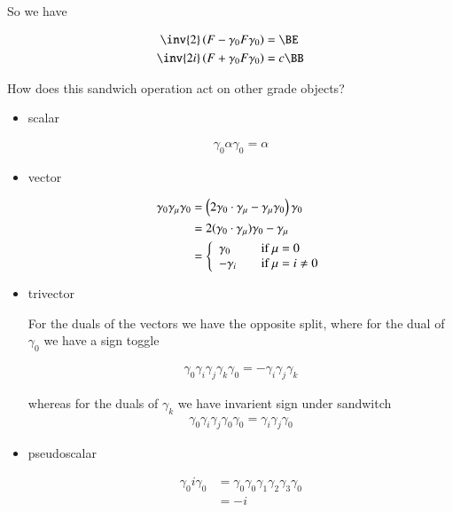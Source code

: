 \documentclass{article}
\begin{document}
So we have

\begin{align*}
\inv{2} \left(F - \gamma_0 F \gamma_0 \right) &= \BE \\
\inv{2i} \left(F + \gamma_0 F \gamma_0 \right) &= c \BB
\end{align*}

How does this sandwich operation act on other grade objects?

\begin{itemize}
\item scalar

\begin{align*}
\gamma_0 \alpha \gamma_0 = \alpha
\end{align*}

\item vector

\begin{align*}
\gamma_0 \gamma_\mu \gamma_0 
&= \left(2 \gamma_0 \cdot \gamma_\mu - \gamma_\mu \gamma_0\right) \gamma_0 \\
&= 2 (\gamma_0 \cdot \gamma_\mu) \gamma_0 - \gamma_\mu \\
&= 
\left\{
\begin{array}{l l}
\gamma_0 & \quad \mbox{if $\mu = 0$} \\
-\gamma_i & \quad \mbox{if $\mu = i \ne 0$} \\
\end{array} \right.
\end{align*}

\item trivector

For the duals of the vectors we have the opposite split, where for the dual of $\gamma_0$ we have a sign
toggle

\begin{align*}
\gamma_0 \gamma_i \gamma_j \gamma_k \gamma_0 = -\gamma_i \gamma_j \gamma_k
\end{align*}

whereas for the duals of $\gamma_k$ we have invarient sign under sandwitch
\begin{align*}
\gamma_0 \gamma_i \gamma_j \gamma_0 \gamma_0 = \gamma_i \gamma_j \gamma_0
\end{align*}

\item pseudoscalar

\begin{align*}
\gamma_0 i \gamma_0 
&= \gamma_0 \gamma_0 \gamma_1 \gamma_2 \gamma_3 \gamma_0 \\
&= -i 
\end{align*}
\end{itemize}
\end{document}
